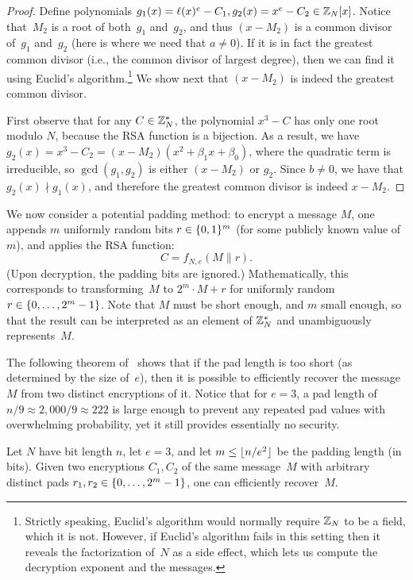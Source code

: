 \documentclass[11pt]{article}
\begin{document}
\begin{proof}
  Define polynomials
  $g_1(x)=\ell(x)^{e}-C_1, g_2(x)=x^{e}-C_2 \in \mathbb{Z}_{N}[x]$. Notice
  that~$M_2$ is a root of both~$g_1$ and~$g_2$, and thus $(x-M_2)$ is
  a common divisor of~$g_1$ and~$g_2$ (here is where we need that
  $a \neq 0$). If it is in fact the greatest common divisor (i.e., the
  common divisor of largest degree), then we can find it using
  Euclid's algorithm.\footnote{Strictly speaking, Euclid's algorithm
    would normally require $\mathbb{Z}_{N}$ to be a field, which it is not.
    However, if Euclid's algorithm fails in this setting then it
    reveals the factorization of~$N$ as a side effect, which lets us
    compute the decryption exponent and the messages.} We show next
  that $(x-M_{2})$ is indeed the greatest common divisor.

  First observe that for any $C \in \mathbb{Z}_{N}^*$, the polynomial $x^3-C$
  has only one root modulo $N$, because the RSA function is a
  bijection. As a result, we have
  $g_2(x)=x^3-C_2=(x-M_{2})(x^2+\beta_1x+\beta_0)$, where the
  quadratic term is irreducible, so $\gcd(g_{1}, g_{2})$ is either
  $(x-M_{2})$ or $g_{2}$.  Since $b \neq 0$, we have that $g_2(x)
  \nmid g_1(x)$, and therefore the greatest common divisor is indeed
  $x-M_{2}$.
\end{proof}

We now consider a potential padding method: to encrypt a message $M$,
one appends $m$ uniformly random bits $r \in \{0,1\}^{m}$ (for some
publicly known value of $m$), and applies the RSA function:
\[ C=f_{N,e}(M \| r). \] (Upon decryption, the padding bits are
ignored.) Mathematically, this corresponds to transforming~$M$ to
$2^{m} \cdot M + r$ for uniformly random
$r \in \{0, \ldots, 2^{m}-1\}$. Note that $M$ must be short enough,
and $m$ small enough, so that the result can be interpreted as an
element of $\mathbb{Z}_{N}^{*}$ and unambiguously represents~$M$.

The following theorem of~\cite{DBLP:journals/joc/Coppersmith97} shows
that if the pad length is too short (as determined by the size
of~$e$), then it is possible to efficiently recover the message~$M$
from two distinct encryptions of it. Notice that for $e=3$, a pad
length of $n/9 \approx 2{,}000/9 \approx 222$ is large enough to
prevent any repeated pad values with overwhelming probability, yet it
still provides essentially no security.

\begin{theorem}
  \label{thm:small-e-padding}
  Let $N$ have bit length $n$, let $e=3$, and let
  $m \leq \lfloor n/e^2\rfloor$ be the padding length (in bits). Given two
  encryptions $C_1, C_2$ of the same message~$M$ with arbitrary
  distinct pads $r_{1}, r_{2} \in \{0, \ldots, 2^{m}-1\}$, one can
  efficiently recover~$M$.
\end{theorem}
\end{document}
